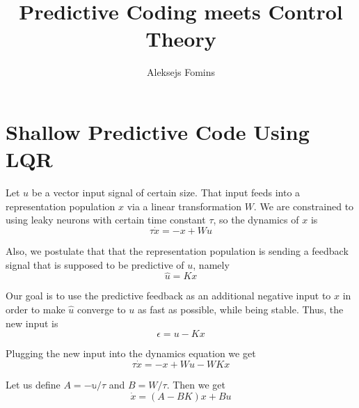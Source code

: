 \documentclass[11pt,a4paper]{article}
\title{Predictive Coding meets Control Theory}
\author{Aleksejs Fomins}
\begin{document}
\maketitle

\begin{abstract}

\end{abstract}

\section{Shallow Predictive Code Using LQR}

Let $u$ be a vector input signal of certain size. That input feeds into a representation population $x$ via a linear transformation $W$. We are constrained to using leaky neurons with certain time constant $\tau$, so the dynamics of $x$ is
$$\tau \dot{x} = -x + Wu$$

Also, we postulate that that the representation population is sending a feedback signal that is supposed to be predictive of $u$, namely 
$$\hat{u} = Kx$$

Our goal is to use the predictive feedback as an additional negative input to $x$ in order to make $\hat{u}$ converge to $u$ as fast as possible, while being stable. Thus, the new input is
$$\epsilon = u - Kx$$

Plugging the new input into the dynamics equation we get
$$\tau \dot{x} = -x + Wu - WKx$$

Let us define $A = -\mathbb{u} / \tau$ and $B = W / \tau$. Then we get
$$\dot{x} = (A - BK)x + Bu$$
\end{document}
